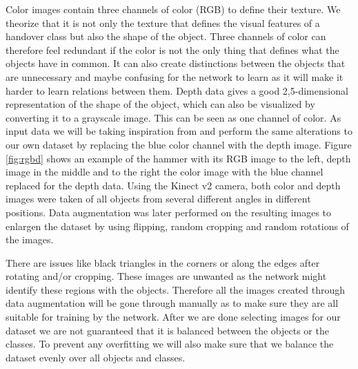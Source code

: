 Color images contain three channels of color (RGB) to define their texture. We theorize that it is not only the texture that defines the visual features of a handover class but also the shape of the object. Three channels of color can therefore feel redundant if the color is not the only thing that defines what the objects have in common. It can also create distinctions between the objects that are unnecessary and maybe confusing for the network to learn as it will make it harder to learn relations between them. Depth data gives a good 2,5-dimensional representation of the shape of the object, which can also be visualized by converting it to a grayscale image. This can be seen as one channel of color. As input data we will be taking inspiration from \parencite{Redmon2014} and perform the same alterations to our own dataset by replacing the blue color channel with the depth image. Figure \ref{fig:rgbd} shows an example of the hammer with its RGB image to the left, depth image in the middle and to the right the color image with the blue channel replaced for the depth data. Using the Kinect v2 camera, both color and depth images were taken of all objects from several different angles in different positions. Data augmentation was later performed on the resulting images to enlargen the dataset by using flipping, random cropping and random rotations of the images.

There are issues like black triangles in the corners or along the edges after rotating and/or cropping. These images are unwanted as the network might identify these regions with the objects. Therefore all the images created through data augmentation will be gone through manually as to make sure they are all suitable for training by the network. After we are done selecting images for our dataset we are not guaranteed that it is balanced between the objects or the classes. To prevent any overfitting we will also make sure that we balance the dataset evenly over all objects and classes.

